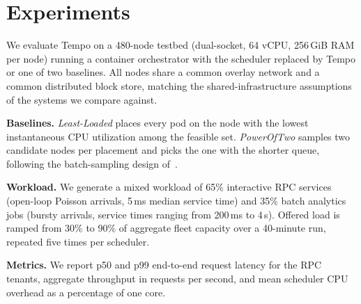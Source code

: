 \section{Experiments}
\label{sec:experiments}

We evaluate Tempo on a 480-node testbed (dual-socket, 64 vCPU, 256\,GiB RAM
per node) running a container orchestrator with the scheduler replaced by
Tempo or one of two baselines. All nodes share a common overlay network and
a common distributed block store, matching the shared-infrastructure
assumptions of the systems we compare against.

\textbf{Baselines.} \emph{Least-Loaded} places every pod on the node with
the lowest instantaneous CPU utilization among the feasible set.
\emph{PowerOfTwo} samples two candidate nodes per placement and picks the
one with the shorter queue, following the batch-sampling design
of~\cite{holm2018batch}.

\textbf{Workload.} We generate a mixed workload of 65\% interactive RPC
services (open-loop Poisson arrivals, 5\,ms median service time) and 35\%
batch analytics jobs (bursty arrivals, service times ranging from 200\,ms
to 4\,s). Offered load is ramped from 30\% to 90\% of aggregate fleet
capacity over a 40-minute run, repeated five times per scheduler.

\textbf{Metrics.} We report p50 and p99 end-to-end request latency for the
RPC tenants, aggregate throughput in requests per second, and mean
scheduler CPU overhead as a percentage of one core.
